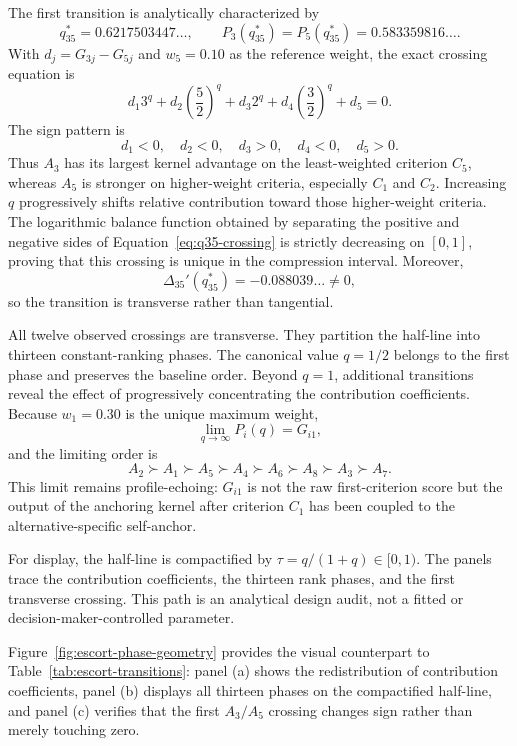 \documentclass[reqno,11pt]{amsart}
\theoremstyle{definition}
\theoremstyle{plain}
\theoremstyle{remark}
\begin{document}
The first transition is analytically characterized by
\begin{equation*}
q_{35}^*
=
0.6217503447\ldots,
\qquad
P_3(q_{35}^*)=P_5(q_{35}^*)=0.583359816\ldots.
\end{equation*}
With $d_j=G_{3j}-G_{5j}$ and $w_5=0.10$ as the reference weight, the exact crossing equation is
\begin{equation}
d_1 3^q
+d_2\left(\frac52\right)^q
+d_3 2^q
+d_4\left(\frac32\right)^q
+d_5
=0.
\label{eq:q35-crossing}
\end{equation}
The sign pattern is
\[
d_1<0,\quad d_2<0,\quad d_3>0,\quad d_4<0,\quad d_5>0.
\]
Thus $A_3$ has its largest kernel advantage on the least-weighted criterion $C_5$, whereas $A_5$ is stronger on higher-weight criteria, especially $C_1$ and $C_2$. Increasing $q$ progressively shifts relative contribution toward those higher-weight criteria. The logarithmic balance function obtained by separating the positive and negative sides of Equation~\eqref{eq:q35-crossing} is strictly decreasing on $[0,1]$, proving that this crossing is unique in the compression interval. Moreover,
\[
\Delta_{35}'(q_{35}^*)=-0.088039\ldots\neq0,
\]
so the transition is transverse rather than tangential.

All twelve observed crossings are transverse. They partition the half-line into thirteen constant-ranking phases. The canonical value $q=1/2$ belongs to the first phase and preserves the baseline order. Beyond $q=1$, additional transitions reveal the effect of progressively concentrating the contribution coefficients. Because $w_1=0.30$ is the unique maximum weight,
\[
\lim_{q\to\infty}P_i(q)=G_{i1},
\]
and the limiting order is
\begin{equation*}
A_2\succ A_1\succ A_5\succ A_4\succ A_6\succ A_8\succ A_3\succ A_7.
\end{equation*}
This limit remains profile-echoing: $G_{i1}$ is not the raw first-criterion score but the output of the anchoring kernel after criterion $C_1$ has been coupled to the alternative-specific self-anchor.

For display, the half-line is compactified by
$\tau=q/(1+q)\in[0,1)$. The panels trace the contribution coefficients, the
thirteen rank phases, and the first transverse crossing. This path is an
analytical design audit, not a fitted or decision-maker-controlled parameter.

Figure~\ref{fig:escort-phase-geometry} provides the visual counterpart to Table~\ref{tab:escort-transitions}: panel (a) shows the redistribution of contribution coefficients, panel (b) displays all thirteen phases on the compactified half-line, and panel (c) verifies that the first $A_3/A_5$ crossing changes sign rather than merely touching zero.
\end{document}
